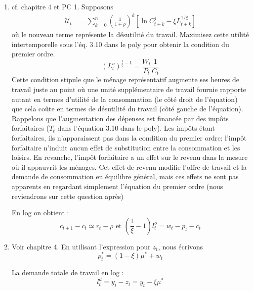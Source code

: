 \documentclass[a4paper,11pt]{article}
\begin{document}
\begin{enumerate}
\item cf. chapitre 4 et PC 1. Supposons \begin{align}
\mathcal{U}_{t}  &  =\sum_{k=0}^{n}\left(  \frac{1}{1+\rho}\right)  ^{k}  \left[\ln
C_{t+k}^{j}  -\xi L_{t+k}^{1/\xi} \right]\label{2 - utilite intertemporelle}
\end{align}
où le nouveau terme représente la désutilité du travail. Maximisez cette utilité intertemporelle sous  l'éq. 3.10 dans le poly pour obtenir la condition du premier ordre. 
\begin{equation*}
\left(L_{t}^{o}\right)^{\frac{1}{\xi }-1}=\frac{W_{t}}{P_{t}} \frac{1}{C_t}\end{equation*}
Cette condition stipule que le ménage représentatif augmente ses heures de travail juste au point où une unité supplémentaire de travail fournie rapporte autant en termes d'utilité de la consommation (le côté droit de l'équation) que cela coûte en termes de désutilité du travail (côté gauche de l'équation). Rappelons que l'augmentation des dépenses est financée par des impôts forfaitaires ($ T_t $ dans l'équation 3.10 dans le poly). Les impôts étant forfaitaires, ils n'apparaissent pas dans la condition du premier ordre: l'impôt forfaitaire n'induit aucun effet de substitution entre la consommation et les loisirs. En revanche, l'impôt forfaitaire a un effet sur le revenu dans la mesure où il appauvrit les ménages. Cet effet de revenu  modifie l'offre de travail et la demande de consommation en équilibre général, mais ces effets ne sont pas apparents en regardant simplement l'équation du premier ordre (nous reviendrons sur cette question après)


En log on obtient :%
\begin{equation*}
c_{t+1}-c_{t}\simeq r_{t}-\rho \text{ \ et \ }\left( \frac{1}{\xi }-1\right)
l_{t}^{o}=w_{t}-p_{t}-c_{t}
\end{equation*}


\item Voir chapitre 4. En utilisant l'expression pour $ z_t $, nous écrivons
\begin{equation*}
p_{t}^{\ast }=\left( 1-\xi \right) \mu ^{\ast }+w_{t}
\end{equation*}%

La demande totale de travail en log :%
\begin{equation*}
l_{t}^{d}=y_{t}-z_{t}=y_{t}-\xi \mu ^{\ast }
\end{equation*}


\end{enumerate}
\end{document}
